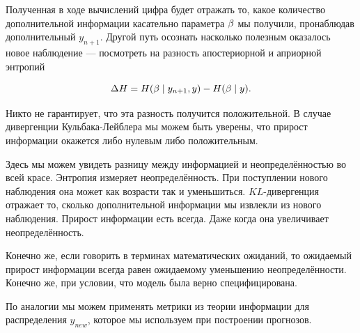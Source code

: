 \documentclass[12pt, a4paper, oneside]{article}
\begin{document}
Полученная в ходе вычислений цифра будет отражать то, какое количество дополнительной информации касательно параметра $\beta$ мы получили, пронаблюдав дополнительный $y_{n+1}$. Другой путь осознать насколько полезным оказалось новое наблюдение  --- посмотреть на разность апостериорной и априорной энтропий

\[ \Delta H =  H(\beta \mid y_{n+1}, y) - H(\beta \mid y).\]

Никто не гарантирует, что эта разность получится положительной.  В случае дивергенции Кульбака-Лейблера мы можем быть уверены, что прирост информации окажется либо нулевым либо положительным.  

Здесь мы можем увидеть разницу между информацией и неопределённостью во всей красе. Энтропия измеряет неопределённость. При поступлении нового наблюдения она может как возрасти так и уменьшиться.  $KL$-дивергенция отражает то, сколько дополнительной информации мы извлекли из нового наблюдения. Прирост информации есть всегда. Даже когда она увеличивает неопределённость. 

Конечно же, если говорить в терминах математических ожиданий, то ожидаемый прирост информации всегда равен ожидаемому уменьшению неопределённости.  Конечно же, при условии, что модель была верно специфицирована.  

По аналогии мы можем применять метрики из теории информации для распределения $y_{new}$, которое мы используем при построении прогнозов.







\end{document}
